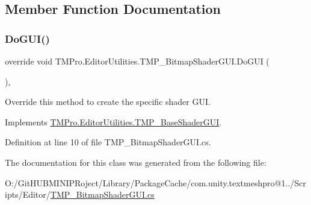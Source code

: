 \subsection{Member Function Documentation}
\mbox{\label{class_t_m_pro_1_1_editor_utilities_1_1_t_m_p___bitmap_shader_g_u_i_af4f6c43167899462930161b3db412cb5}} 
\subsubsection{\texorpdfstring{DoGUI()}{DoGUI()}}
{\footnotesize\ttfamily override void T\+M\+Pro.\+Editor\+Utilities.\+T\+M\+P\+\_\+\+Bitmap\+Shader\+G\+U\+I.\+Do\+G\+UI (\begin{DoxyParamCaption}{ }\end{DoxyParamCaption})\hspace{0.3cm}{\ttfamily [protected]}, {\ttfamily [virtual]}}



Override this method to create the specific shader G\+UI. 



Implements \mbox{\hyperlink{class_t_m_pro_1_1_editor_utilities_1_1_t_m_p___base_shader_g_u_i_a04c57cff2c8f6cf93b5bf50209ef9f5f}{T\+M\+Pro.\+Editor\+Utilities.\+T\+M\+P\+\_\+\+Base\+Shader\+G\+UI}}.



Definition at line 10 of file T\+M\+P\+\_\+\+Bitmap\+Shader\+G\+U\+I.\+cs.



The documentation for this class was generated from the following file\+:\begin{DoxyCompactItemize}
\item 
O\+:/\+Git\+H\+U\+B\+M\+I\+N\+I\+P\+Roject/\+Library/\+Package\+Cache/com.\+unity.\+textmeshpro@1../\+Scripts/\+Editor/\mbox{\hyperlink{_t_m_p___bitmap_shader_g_u_i_8cs}{T\+M\+P\+\_\+\+Bitmap\+Shader\+G\+U\+I.\+cs}}\end{DoxyCompactItemize}
